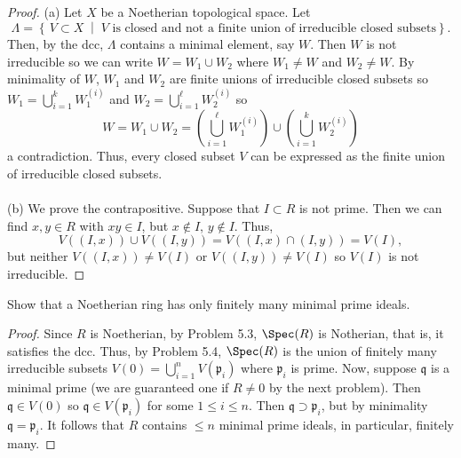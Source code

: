 \begin{proof}
(a) Let $X$ be a Noetherian topological space. Let
\[
\Lambda=\left\{ \,V\subset X\;\middle|\;\text{$V$ is closed and not a
    finite union of irreducible closed subsets} \right\}.
\]
Then, by the dcc, $\Lambda$ contains a minimal element, say $W$. Then
$W$ is not irreducible so we can write $W=W_1\cup W_2$ where $W_1\neq
W$ and $W_2\neq W$. By minimality of $W$, $W_1$ and $W_2$ are finite
unions of irreducible closed subsets so $W_1=\bigcup_{i=1}^k
W_1^{(i)}$ and $W_2=\bigcup_{i=1}^\ell W_2^{(i)}$ so
\[
W=W_1\cup W_2=\left( \bigcup_{i=1}^\ell W_1^{(i)} \right)\cup\left(
  \bigcup_{i=1}^k W_2^{(i)} \right)
\]
a contradiction. Thus, every closed subset $V$ can be expressed as the
finite union of irreducible closed subsets.
\\\\
(b) We prove the contrapositive. Suppose that $I\subset R$ is not
prime. Then we can find $x,y\in R$ with $xy\in I$, but $x\notin I$,
$y\notin I$. Thus,
\[
V((I,x))\cup V((I,y))=V((I,x)\cap (I,y))=V(I),
\]
but neither $V((I,x))\neq V(I)$ or $V((I,y))\neq V(I)$ so $V(I)$ is
not irreducible. \qedhere
\end{proof}
\newpage
\begin{problem}
Show that a Noetherian ring has only finitely many minimal prime
ideals.
\end{problem}
\begin{proof}
Since $R$ is Noetherian, by Problem 5.3, $\Spec(R)$ is Notherian, that
is, it satisfies the dcc. Thus, by Problem 5.4, $\Spec(R)$ is the
union of finitely many irreducible subsets
$V(0)=\bigcup_{i=1}^nV(\mathfrak{p}_i)$ where $\mathfrak{p}_i$ is
prime. Now, suppose $\mathfrak{q}$ is a minimal prime (we are
guaranteed one if $R\neq 0$ by the next problem). Then
$\mathfrak{q}\in V(0)$ so $\mathfrak{q}\in V(\mathfrak{p}_i)$ for some
$1\leq i\leq n$. Then $\mathfrak{q}\supset\mathfrak{p}_i$, but by
minimality $\mathfrak{q}=\mathfrak{p}_i$. It follows that $R$ contains
$\leq n$ minimal prime ideals, in particular, finitely many.
\end{proof}
